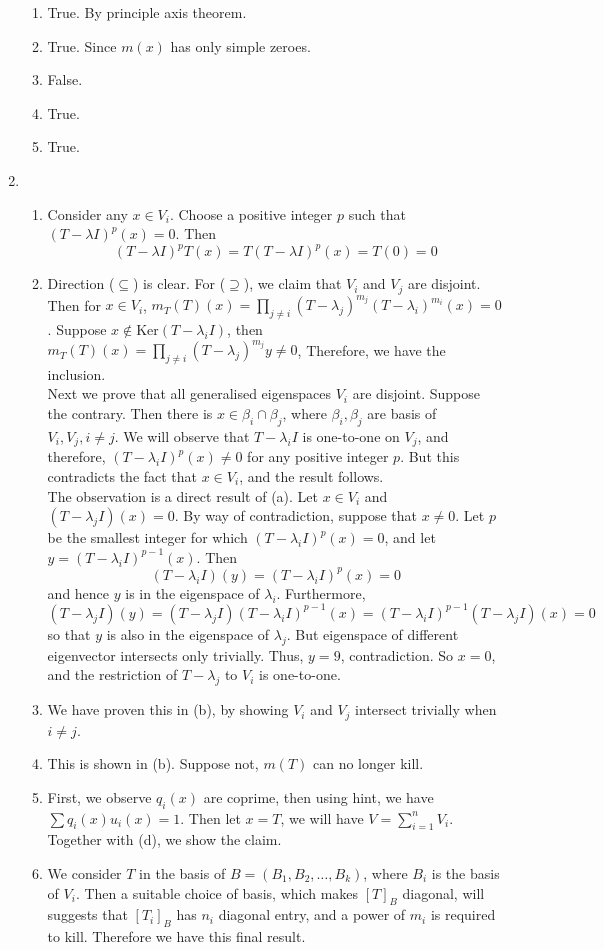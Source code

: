 \documentclass[12pt]{article}
\newcommand{\kerne}{\mathrm{Ker}}
\theoremstyle{definition}
\begin{document}
\begin{enumerate}
\begin{enumerate}
    \item True. By principle axis theorem.
    \item True. Since $m(x)$ has only simple zeroes.
    \item False.
    \item True.
    \item True.
  \end{enumerate}
  \item %
  \begin{enumerate}
    \item Consider any $x\in V_i$. Choose a positive integer $p$ such that $(T-\lambda I)^p(x) = 0$. Then
    \[
(T-\lambda I)^pT(x) = T(T-\lambda I)^p(x) = T(0) = 0
    \]
    \item Direction ($\subseteq$) is clear. For ($\supseteq$), we claim that $V_i$ and $V_j$ are disjoint. Then for $x\in V_i$, $m_T(T)(x)= \prod_{j\neq i}(T-\lambda_j)^{m_j} (T-\lambda_i)^{m_i}(x)= 0$. Suppose $x\not\in \kerne(T-\lambda_iI)$, then $m_T(T)(x) = \prod_{j\neq i}(T-\lambda_j)^{m_j} y \neq 0$, Therefore, we have the inclusion.\\Next we prove that all generalised eigenspaces $V_i$ are disjoint. Suppose the contrary. Then there is $x\in \beta_i\cap\beta_j$, where $\beta_i,\beta_j$ are basis of $V_i,V_j, i\neq j$. We will observe that $T-\lambda_iI$ is one-to-one on $V_j$, and therefore, $(T-\lambda_iI)^p(x)\neq 0$ for any positive integer $p$. But this contradicts the fact that $x\in V_i$, and the result follows.\\
    The observation is a direct result of (a). Let $x\in V_i$ and $(T-\lambda_j I)(x) = 0$. By way of contradiction, suppose that $x\neq 0$. Let $p$ be the smallest integer for which $(T-\lambda_i I)^p(x) = 0$, and let $y = (T-\lambda_i I)^{p-1}(x)$. Then
    \[
(T-\lambda_iI)(y) = (T-\lambda_i I)^p(x) = 0
    \]
    and hence $y$ is in the eigenspace of $\lambda_i$. Furthermore,
    \[
(T-\lambda_jI)(y) = (T-\lambda_jI)(T-\lambda_iI)^{p-1}(x) = (T-\lambda_iI)^{p-1}(T-\lambda_jI)(x) = 0
    \]
    so that $y$ is also in the eigenspace of $\lambda_j$. But eigenspace of different eigenvector intersects only trivially. Thus, $y=9$, contradiction. So $x=0$, and the restriction of $T-\lambda_j$ to $V_i$ is one-to-one.
    \item We have proven this in (b), by showing $V_i$ and $V_j$ intersect trivially when $i\neq j$.
    \item This is shown in (b). Suppose not, $m(T)$ can no longer kill.
    \item First, we observe $q_i(x)$ are coprime, then using hint, we have $\sum q_i(x)u_i(x) = 1$. Then let $x = T$, we will have $V = \sum_{i=1}^n V_i$. Together with (d), we show the claim.
    \item We consider $T$ in the basis of $B = (B_1,B_2,\ldots, B_k)$, where $B_i$ is the basis of $V_i$. Then a suitable choice of basis, which makes $[T]_B$ diagonal, will suggests that $[T_i]_B$ has $n_i$ diagonal entry, and a power of $m_i$ is required to kill. Therefore we have this final result. 
  \end{enumerate}
\end{enumerate}
\end{document}

